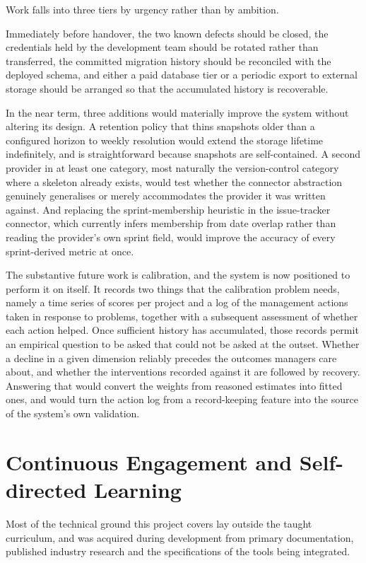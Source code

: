 Work falls into three tiers by urgency rather than by ambition.

Immediately before handover, the two known defects should be closed, the
credentials held by the development team should be rotated rather than
transferred, the committed migration history should be reconciled with the
deployed schema, and either a paid database tier or a periodic export to external
storage should be arranged so that the accumulated history is recoverable.

In the near term, three additions would materially improve the system without
altering its design. A retention policy that thins snapshots older than a
configured horizon to weekly resolution would extend the storage lifetime
indefinitely, and is straightforward because snapshots are self-contained. A
second provider in at least one category, most naturally the version-control
category where a skeleton already exists, would test whether the connector
abstraction genuinely generalises or merely accommodates the provider it was
written against. And replacing the sprint-membership heuristic in the
issue-tracker connector, which currently infers membership from date overlap
rather than reading the provider's own sprint field, would improve the accuracy of
every sprint-derived metric at once.

The substantive future work is calibration, and the system is now positioned to
perform it on itself. It records two things that the calibration problem needs,
namely a time series of scores per project and a log of the management actions
taken in response to problems, together with a subsequent assessment of whether
each action helped. Once sufficient history has accumulated, those records permit
an empirical question to be asked that could not be asked at the outset. Whether
a decline in a given dimension reliably precedes the outcomes managers care
about, and whether the interventions recorded against it are followed by
recovery. Answering that would convert the weights from reasoned estimates into
fitted ones, and would turn the action log from a record-keeping feature into the
source of the system's own validation.

\section{Continuous Engagement and Self-directed Learning}
\label{sec:lessons}

Most of the technical ground this project covers lay outside the taught
curriculum, and was acquired during development from primary documentation,
published industry research and the specifications of the tools being integrated.

